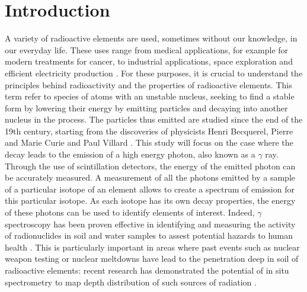 \section{Introduction}
A variety of radioactive elements are used, sometimes without our knowledge, in our everyday life.
These uses range from medical applications, for example for modern treatments for cancer, to industrial applications, space exploration and efficient electricity production \cite{andrea_galindo_what_2023} \cite{esa_radiation}.
For these purposes, it is crucial to understand the principles behind radioactivity and the properties of radioactive elements.
This term refer to species of atoms with an unstable nucleus, seeking to find a stable form by lowering their energy by emitting particles and decaying into another nucleus in the process.
The particles thus emitted are studied since the end of the 19th century, starting from the discoveries of physicists Henri Becquerel, Pierre and Marie Curie and Paul Villard \cite{britannica_atom}.
This study will focus on the case where the decay leads to the emission of a high energy photon, also known as a \(\gamma\) ray.
Through the use of scintillation detectors, the energy of the emitted photon can be accurately measured.
A measurement of all the photons emitted by a sample of a particular isotope of an element allows to create a spectrum of emission for this particular isotope.
As each isotope has its own decay properties, the energy of these photons can be used to identify elements of interest.
Indeed, $\gamma$ spectroscopy has been proven effective in identifying and measuring the activity of radionuclides in soil and water samples to assest potential hazards to human health \cite{ramadhany_assessment_2022} \cite{kim_design_2022}.
This is particularly important in areas where past events such as nuclear weapon testing or nuclear meltdowns have lead to the penetration deep in soil of radioactive elements: 
recent research has demonstrated the potential of in situ spectrometry to map depth distribution of such sources of radiation \cite{varley_situ_2017}.

